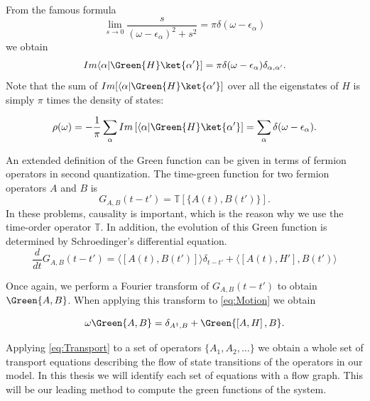 From the famous formula 
\begin{equation}
\lim_{s\rightarrow0}\frac{s}{(\omega-\epsilon_{\alpha})^{2}+s^{2}}=\pi\delta(\omega-\epsilon_{\alpha})
\end{equation}
we obtain 
\begin{equation}
    Im \langle \alpha  \vert \Green{H}\ket{\alpha'}] = \pi \delta(\omega -\epsilon_\alpha)\delta_{\alpha,\alpha'}.
\end{equation}
Note that the sum of $Im[ \langle \alpha  \vert \Green{H}\ket{\alpha'}]$ over all the eigenstates of $H$ is simply $\pi$ times the density of states:

\begin{equation}
    \rho(\omega)=-\frac{1}{\pi} \sum_\alpha Im \left[ \langle \alpha  \vert \Green{H}\ket{\alpha'}\right] = \sum_\alpha \delta(\omega-\epsilon_\alpha) . \label{eq:DOS_def}
\end{equation}

An extended definition of the Green function  can be given in terms of fermion operators in second quantization.  The time-green function for two fermion operators $A$ and $B$ is
\begin{equation}
  G_{A,B}(t-t') = \mathbb{T}[\{ A(t),B(t') \} ]. \label{eq:TempGreen}
\end{equation}
In these problems, causality is important, which is the reason why we use the time-order operator $\mathbb{T}$.  In addition, the evolution of this Green function is determined by Schroedinger's differential equation. 
\begin{equation}
\frac{d}{dt}G_{A,B}\left(t-t'\right)=\langle\left[A(t),B(t')\right]\rangle\delta_{t-t'}+\langle\left[A(t),H'\right],B(t')\rangle
\label{eq:Motion}
\end{equation}

Once again, we perform a Fourier transform of $G_{A,B}(t-t') $ to obtain $\Green{A,B}$. When applying this transform to \ref{eq:Motion} we obtain 

\begin{equation}
    \omega\Green{A,B}=\delta_{A^{\dagger},B}+\Green{\left[A,H\right],B}.
    \label{eq:Transport}
\end{equation}


\noindent Applying \ref{eq:Transport}  to a set of operators $\{A_1, A_2, \ldots \}$ we obtain a whole set of transport equations describing the flow of state transitions of the operators in our model. In this thesis we will identify each set of equations with a flow graph. This will be our leading method to compute the green functions of the system.

